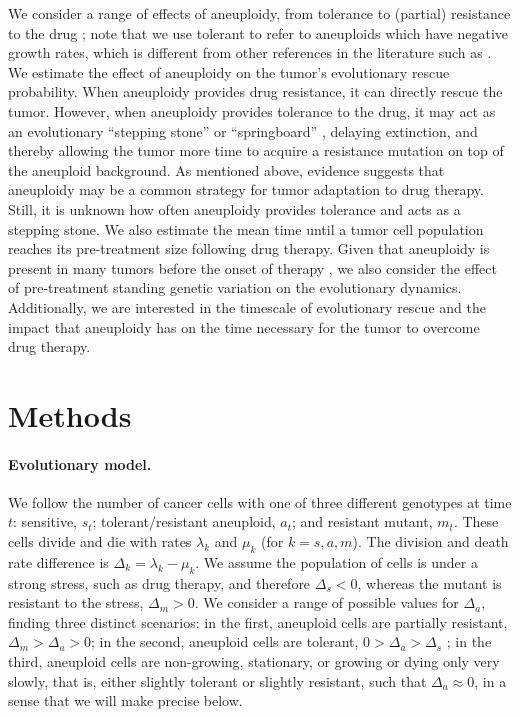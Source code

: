 \documentclass[12pt]{extarticle}
\begin{document}
We consider a range of effects of aneuploidy, from tolerance to (partial) resistance to the drug \citep{brauner2016distinguishing}; note that we use tolerant to refer to aneuploids which have negative growth rates, which is different from other references in the literature such as \citet{berman2020drug}. %
We estimate the effect of aneuploidy on the tumor's evolutionary rescue probability. When aneuploidy provides drug resistance, it can directly rescue the tumor. However, when aneuploidy provides tolerance to the drug, it may act as an evolutionary ``stepping stone'' or ``springboard'' \citep{Yona2015,martin2013probability,osmond_genetic_2020}, delaying extinction, and thereby allowing the tumor more time to acquire a resistance mutation on top of the aneuploid background. 
As mentioned above, evidence suggests that aneuploidy may be a common strategy for tumor adaptation to drug therapy. Still, it is unknown how often aneuploidy provides tolerance and acts as a stepping stone.
We also estimate the mean time until a tumor cell population reaches its pre-treatment size following drug therapy. 
Given that aneuploidy is present in many tumors before the onset of therapy \citep{lukow2021chromosomal,ben2020context}, we also consider the effect of pre-treatment standing genetic variation on the evolutionary dynamics. Additionally, we are interested in the timescale of evolutionary rescue and the impact that aneuploidy has on the time necessary for the tumor to overcome drug therapy. 

\section*{Methods}

\paragraph{Evolutionary model.}
We follow the number of cancer cells with one of three different genotypes at time $t$: sensitive, $s_t$; tolerant/resistant aneuploid, $a_t$; and resistant mutant, $m_t$. 
These cells divide and die with rates $\lambda_k$ and $\mu_k$ (for $k=s, a, m$).
The division and death rate difference is $\Delta_k = \lambda_k-\mu_k$.
We assume the population of cells is under a strong stress, such as drug therapy, and therefore $\Delta_s<0$, whereas the mutant is resistant to the stress, $\Delta_m>0$.
We consider a range of possible values for $\Delta_a$, finding three distinct scenarios: in the first, aneuploid cells are partially resistant, $\Delta_m>\Delta_a>0$; in the second, aneuploid cells are tolerant, $0>\Delta_a>\Delta_s$ \citep[see][for the distinction between susceptible, resistant, and tolerant]{brauner2016distinguishing}; in the third, aneuploid cells are non-growing, stationary, or growing or dying only very slowly, that is, either slightly tolerant or slightly resistant, such that $\Delta_a \approx 0$, in a sense that we will make precise below. 
\end{document}
